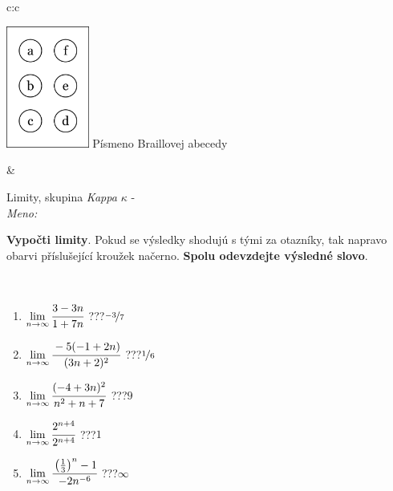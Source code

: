 \documentclass[10pt]{report}
\begin{document}
\begin{tabular}{c:c}
\begin{minipage}[c][104.5mm][t]{0.5\linewidth}
\begin{center}
\begin{minipage}{0.20\linewidth}
\begin{center}
\includegraphics[height=40mm]{../images/braille.png}
{\small Písmeno Braillovej abecedy}
\end{center}
\end{minipage}
\end{center}
\end{minipage}
&
\begin{minipage}[c][104.5mm][t]{0.5\linewidth}
\begin{center}
\vspace{7mm}
{\huge Limity, skupina \textit{Kappa $\kappa$} -}\\[5mm]
\textit{Meno:}\phantom{xxxxxxxxxxxxxxxxxxxxxxxxxxxxxxxxxxxxxxxxxxxxxxxxxxxxxxxxxxxxxxxxx}\\[5mm]
\begin{minipage}{0.95\linewidth}
\begin{center}
\textbf{Vypočti limity}. Pokud se výsledky shodujú s tými za otazníky, tak napravo\\obarvi příslušející kroužek načerno. \textbf{Spolu odevzdejte výsledné slovo}.
\end{center}
\end{minipage}
\\[1mm]
\begin{minipage}{0.79\linewidth}
\begin{center}
\begin{varwidth}{\linewidth}
\begin{enumerate}
\normalsize
\item $\lim\limits_{n\to\infty}\cfrac{3-3n}{1+7n}$\quad \dotfill\; ???\;\dotfill \quad $\nicefrac{-3}{7}$
\item $\lim\limits_{n\to\infty}\cfrac{-5(-1+2n)}{(3n+2)^2}$\quad \dotfill\; ???\;\dotfill \quad $\nicefrac{1}{6}$
\item $\lim\limits_{n\to\infty}\cfrac{(-4+3n)^2}{n^2+n+7}$\quad \dotfill\; ???\;\dotfill \quad $9$
\item $\lim\limits_{n\to\infty}\cfrac{2^{n+4}}{2^{n+4}}$\quad \dotfill\; ???\;\dotfill \quad $1$
\item $\lim\limits_{n\to\infty}\cfrac{\left(\frac{1}{3}\right)^n -1}{-2n^{-6}}$\quad \dotfill\; ???\;\dotfill \quad $\infty$

\end{enumerate}
\end{varwidth}
\end{center}
\end{minipage}
\end{center}
\end{minipage}
\end{tabular}
\end{document}
